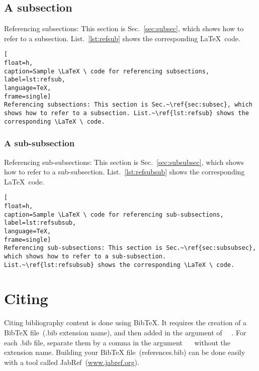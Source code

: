 \subsection*{A subsection}
\label{sec:subsec}

Referencing subsections: This section is Sec.~\ref{sec:subsec}, which shows how to refer to a subsection. List.~\ref{lst:refsub} shows the corresponding \LaTeX \ code. 

\begin{lstlisting}[
float=h,
caption=Sample \LaTeX \ code for referencing subsections, 
label=lst:refsub,
language=TeX,
frame=single]
Referencing subsections: This section is Sec.~\ref{sec:subsec}, which shows how to refer to a subsection. List.~\ref{lst:refsub} shows the corresponding \LaTeX \ code. 
\end{lstlisting} 
\textcolor[rgb]{0.75,0.75,0.75}{\blindtext}
\cleardoublepage





\subsubsection*{A sub-subsection}
\label{sec:subsubsec}


Referencing sub-subsections: This section is Sec.~\ref{sec:subsubsec}, which shows how to refer to a sub-subsection.  List.~\ref{lst:refsubsub} shows the corresponding \LaTeX \ code. 

\begin{lstlisting}[
float=h,
caption=Sample \LaTeX \ code for referencing sub-subsections, 
label=lst:refsubsub,
language=TeX,
frame=single]
Referencing sub-subsections: This section is Sec.~\ref{sec:subsubsec}, which shows how to refer to a sub-subsection. List.~\ref{lst:refsubsub} shows the corresponding \LaTeX \ code. 
\end{lstlisting}

\textcolor[rgb]{0.75,0.75,0.75}{\blindtext}
\cleardoublepage





\newpage
\section*{Citing}
\label{sec:cit}

Citing bibliography content is done using BibTeX. It requires the creation of a BibTeX file~(.bib extension name), and then added in the argument of \verb|  |. For each .bib file, separate them by a comma in the argument \verb|  | without the extension name. Building your BibTeX file~(references.bib) can be done easily with a tool called JabRef~(\url{www.jabref.org}).

